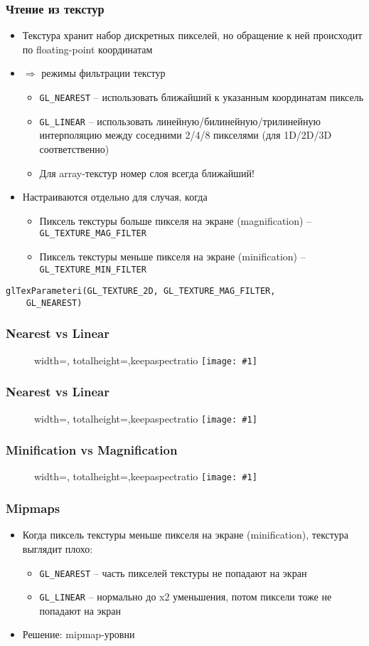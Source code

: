 \documentclass{beamer}
\newcommand{\slideimage}[1]{
  \begin{figure}
    \begin{adjustbox}{width=\textwidth, totalheight=\textheight-2\baselineskip-2\baselineskip,keepaspectratio}
      \texttt{[image: \#1]}
    \end{adjustbox}
  \end{figure}
}
\begin{document}
\begin{frame}[fragile]
\frametitle{Чтение из текстур}
\begin{itemize}
\item Текстура хранит набор дискретных пикселей, но обращение к ней происходит по floating-point координатам
\pause
\item \begin{math}\Rightarrow\end{math} режимы фильтрации текстур
\begin{itemize}
\item \verb|GL_NEAREST| -- использовать ближайший к указанным координатам пиксель
\item \verb|GL_LINEAR| -- использовать линейную/билинейную/трилинейную интерполяцию между соседними 2/4/8 пикселями (для 1D/2D/3D соответственно)
\item Для array-текстур номер слоя всегда ближайший!
\end{itemize}
\pause
\item Настраиваются отдельно для случая, когда
\begin{itemize}
\item Пиксель текстуры больше пикселя на экране (magnification) -- \verb|GL_TEXTURE_MAG_FILTER|
\item Пиксель текстуры меньше пикселя на экране (minification) -- \verb|GL_TEXTURE_MIN_FILTER|
\end{itemize}
\end{itemize}
\pause
\begin{verbatim}
glTexParameteri(GL_TEXTURE_2D, GL_TEXTURE_MAG_FILTER,
    GL_NEAREST)
\end{verbatim}
\end{frame}

\begin{frame}
\frametitle{Nearest vs Linear}
\slideimage{pikachu.png}
\end{frame}

\begin{frame}
\frametitle{Nearest vs Linear}
\slideimage{nearest_linear.png}
\end{frame}

\begin{frame}
\frametitle{Minification vs Magnification}
\slideimage{earth.png}
\end{frame}

\begin{frame}[fragile]
\frametitle{Mipmaps}
\begin{itemize}
\item Когда пиксель текстуры меньше пикселя на экране (minification), текстура выглядит плохо:
\begin{itemize}
\item \verb|GL_NEAREST| -- часть пикселей текстуры не попадают на экран
\item \verb|GL_LINEAR| -- нормально до x2 уменьшения, потом пиксели тоже не попадают на экран
\end{itemize}
\pause
\item Решение: mipmap-уровни
\end{itemize}
\end{frame}
\end{document}
